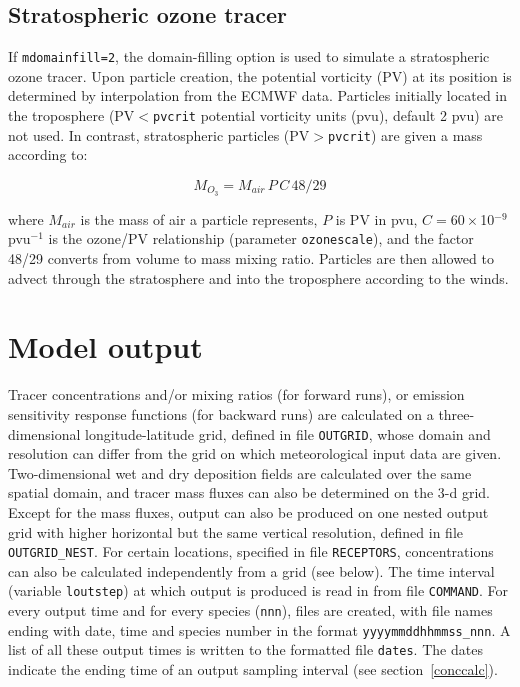 \documentclass{egu}            %
\begin{document}
\subsection{Stratospheric ozone tracer}

If \verb|mdomainfill=2|, the domain-filling option is used to simulate a
stratospheric ozone tracer.  Upon particle creation, the potential vorticity
(PV) at its position is determined by interpolation from the ECMWF data.
Particles initially located in the troposphere (PV$<$\verb|pvcrit| potential
vorticity units (pvu), default 2 pvu) are not used.  In contrast, stratospheric
particles (PV$>$\verb|pvcrit|) are given a mass according to:

\begin{equation}
M_{O_3}=M_{air}\, P \, C \, 48/29
\end{equation}

where $M_{air}$ is the mass of air a particle represents, $P$ is PV in pvu,
$C=60\times$10$^{-9}$ pvu$^{-1}$ is the ozone/PV relationship \citep{stohl2000}
(parameter \verb|ozonescale|), and the factor 48/29 converts from volume to
mass mixing ratio.  Particles are then allowed to advect through the
stratosphere and into the troposphere according to the winds.

\section{Model output}

Tracer concentrations and/or mixing ratios (for forward runs), or emission
sensitivity response functions (for backward runs) are calculated on a
three-dimensional longitude-latitude grid, defined in file \verb|OUTGRID|,
whose domain and resolution can differ from the grid on which meteorological
input data are given.  Two-dimensional wet and dry deposition fields are
calculated over the same spatial domain, and tracer mass fluxes can also be
determined on the 3-d grid.  Except for the mass fluxes, output can also be
produced on one nested output grid with higher horizontal but the same vertical
resolution, defined in file \verb|OUTGRID_NEST|.  For certain locations,
specified in file \verb|RECEPTORS|, concentrations can also be calculated
independently from a grid (see below).  The time interval (variable
\verb|loutstep|) at which output is produced is read in from file
\verb|COMMAND|.  For every output time and for every species (\verb|nnn|),
files are created, with file names ending with date, time and species number in
the format \verb|yyyymmddhhmmss_nnn|.  A list of all these output times is
written to the formatted file \verb|dates|.  The dates indicate the ending time
of an output sampling interval (see section~\ref{conccalc}).
\end{document}
